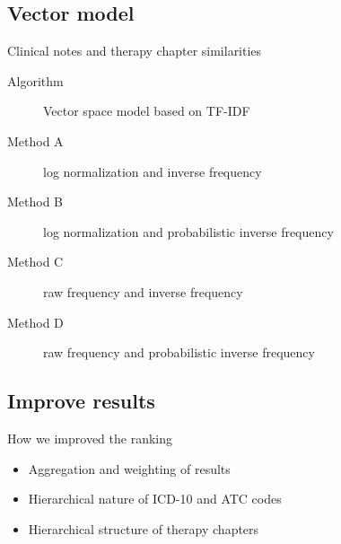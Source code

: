 \documentclass[screen, compress]{beamer}
\begin{document}
\subsection{Vector model}
{
\begin{frame}{Clinical notes and therapy chapter similarities} %
\Large
\begin{description}
	\item[Algorithm] Vector space model based on TF-IDF
	\item[Method A] log normalization and inverse frequency
	\item[Method B] log normalization and probabilistic inverse frequency
	\item[Method C] raw frequency and inverse frequency
	\item[Method D] raw frequency and probabilistic inverse frequency
\end{description}
\end{frame}
}

\subsection{Improve results}
\begin{frame}{How we improved the ranking} %
\Large
\begin{itemize}
	\item Aggregation and weighting of results
	\item Hierarchical nature of ICD-10 and ATC codes
	\item Hierarchical structure of therapy chapters
\end{itemize}
\end{frame}
\end{document}
